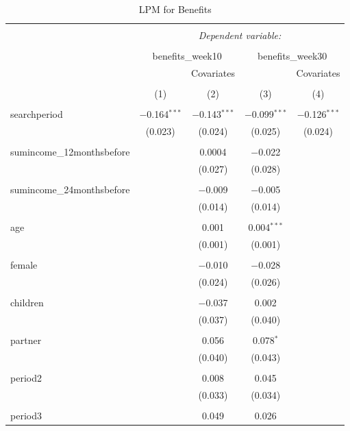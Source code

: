 \documentclass[
]{article}
\begin{document}
\begin{table}[!htbp] \centering 
  \caption{LPM for Benefits} 
  \label{} 
\begin{tabular}{@{\extracolsep{5pt}}lcccc} 
\\[-1.8ex]\hline 
\hline \\[-1.8ex] 
 & \multicolumn{4}{c}{\textit{Dependent variable:}} \\ 
\cline{2-5} 
\\[-1.8ex] & \multicolumn{2}{c}{benefits\_week10} & \multicolumn{2}{c}{benefits\_week30} \\ 
 &  & Covariates &  & Covariates \\ 
\\[-1.8ex] & (1) & (2) & (3) & (4)\\ 
\hline \\[-1.8ex] 
 searchperiod & $-$0.164$^{***}$ & $-$0.143$^{***}$ & $-$0.099$^{***}$ & $-$0.126$^{***}$ \\ 
  & (0.023) & (0.024) & (0.025) & (0.024) \\ 
  & & & & \\ 
 sumincome\_12monthsbefore &  & 0.0004 & $-$0.022 &  \\ 
  &  & (0.027) & (0.028) &  \\ 
  & & & & \\ 
 sumincome\_24monthsbefore &  & $-$0.009 & $-$0.005 &  \\ 
  &  & (0.014) & (0.014) &  \\ 
  & & & & \\ 
 age &  & 0.001 & 0.004$^{***}$ &  \\ 
  &  & (0.001) & (0.001) &  \\ 
  & & & & \\ 
 female &  & $-$0.010 & $-$0.028 &  \\ 
  &  & (0.024) & (0.026) &  \\ 
  & & & & \\ 
 children &  & $-$0.037 & 0.002 &  \\ 
  &  & (0.037) & (0.040) &  \\ 
  & & & & \\ 
 partner &  & 0.056 & 0.078$^{*}$ &  \\ 
  &  & (0.040) & (0.043) &  \\ 
  & & & & \\ 
 period2 &  & 0.008 & 0.045 &  \\ 
  &  & (0.033) & (0.034) &  \\ 
  & & & & \\ 
 period3 &  & 0.049 & 0.026 &  \\ 

\end{tabular}
\end{table}
\end{document}
